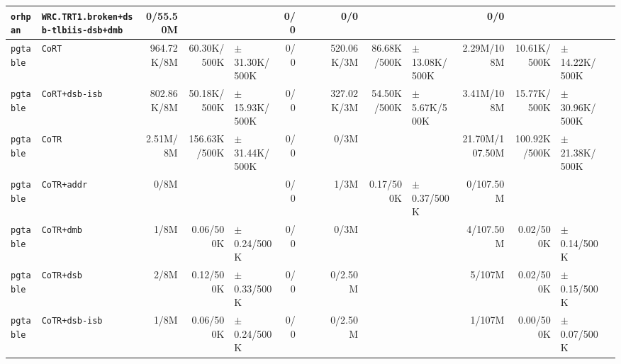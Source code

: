 \begin{tabular}{l l  | r r l | r r l | r r l | r r l l}
         \verb|orhpan| &                   \verb|WRC.TRT1.broken+dsb-tlbiis-dsb+dmb| &       0/55.50M &                       &                   &            0/0 &                       &  &            0/0 &                       &                   &            0/0 &                       &                    & \\ \hline 
        \verb|pgtable| &                                                 \verb|CoRT| &     964.72K/8M &           60.30K/500K & $\pm$ 31.30K/500K &            0/0 &                       &  &     520.06K/3M &           86.68K/500K & $\pm$ 13.08K/500K &     2.29M/108M &           10.61K/500K &  $\pm$ 14.22K/500K & \\ \hline 
        \verb|pgtable| &                                         \verb|CoRT+dsb-isb| &     802.86K/8M &           50.18K/500K & $\pm$ 15.93K/500K &            0/0 &                       &  &     327.02K/3M &           54.50K/500K &  $\pm$ 5.67K/500K &     3.41M/108M &           15.77K/500K &  $\pm$ 30.96K/500K & \\ \hline 
        \verb|pgtable| &                                                 \verb|CoTR| &       2.51M/8M &          156.63K/500K & $\pm$ 31.44K/500K &            0/0 &                       &  &           0/3M &                       &                   & 21.70M/107.50M &          100.92K/500K &  $\pm$ 21.38K/500K & \\ \hline 
        \verb|pgtable| &                                            \verb|CoTR+addr| &           0/8M &                       &                   &            0/0 &                       &  &           1/3M &             0.17/500K &   $\pm$ 0.37/500K &      0/107.50M &                       &                    & \\ \hline 
        \verb|pgtable| &                                             \verb|CoTR+dmb| &           1/8M &             0.06/500K &   $\pm$ 0.24/500K &            0/0 &                       &  &           0/3M &                       &                   &      4/107.50M &             0.02/500K &    $\pm$ 0.14/500K & \\ \hline 
        \verb|pgtable| &                                             \verb|CoTR+dsb| &           2/8M &             0.12/500K &   $\pm$ 0.33/500K &            0/0 &                       &  &        0/2.50M &                       &                   &         5/107M &             0.02/500K &    $\pm$ 0.15/500K & \\ \hline 
        \verb|pgtable| &                                         \verb|CoTR+dsb-isb| &           1/8M &             0.06/500K &   $\pm$ 0.24/500K &            0/0 &                       &  &        0/2.50M &                       &                   &         1/107M &             0.00/500K &    $\pm$ 0.07/500K & \\ \hline 

\end{tabular}
